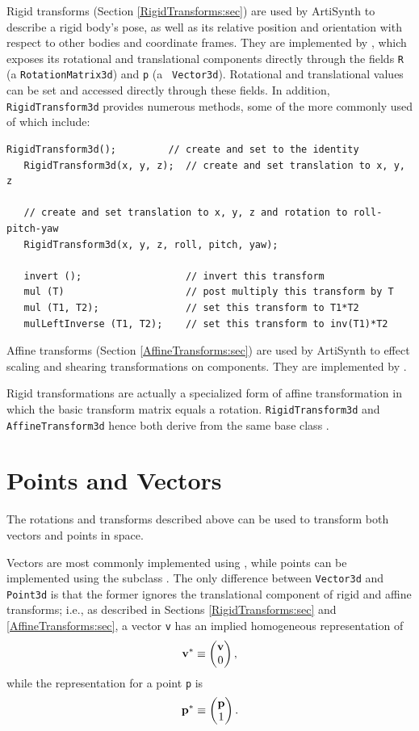 Rigid transforms (Section \ref{RigidTransforms:sec}) are used by
ArtiSynth to describe a rigid body's pose, as well as its relative
position and orientation with respect to other bodies and coordinate
frames.  They are implemented by
, which exposes its
rotational and translational components directly through the fields
{\tt R} (a {\tt RotationMatrix3d}) and {\tt p} (a {\tt
Vector3d}). Rotational and translational values can be set and
accessed directly through these fields.  In addition, {\tt
RigidTransform3d} provides numerous methods, some of the more commonly
used of which include:
%
\begin{lstlisting}[]
   RigidTransform3d();         // create and set to the identity
   RigidTransform3d(x, y, z);  // create and set translation to x, y, z

   // create and set translation to x, y, z and rotation to roll-pitch-yaw
   RigidTransform3d(x, y, z, roll, pitch, yaw);

   invert ();                  // invert this transform
   mul (T)                     // post multiply this transform by T
   mul (T1, T2);               // set this transform to T1*T2
   mulLeftInverse (T1, T2);    // set this transform to inv(T1)*T2
\end{lstlisting}
%

Affine transforms (Section \ref{AffineTransforms:sec}) are used by
ArtiSynth to effect scaling and shearing transformations on
components. They are implemented by
.

Rigid transformations are actually a specialized form of affine
transformation in which the basic transform matrix equals a rotation.
{\tt RigidTransform3d} and {\tt AffineTransform3d} hence both derive
from the same base class
.

\section{Points and Vectors}

The rotations and transforms described above can be used to transform
both vectors and points in space.

Vectors are most commonly implemented using
, while points can be implemented
using the subclass .  The only
difference between {\tt Vector3d} and {\tt Point3d} is that the former
ignores the translational component of rigid and affine transforms;
i.e., as described in Sections \ref{RigidTransforms:sec} and
\ref{AffineTransforms:sec}, a vector {\tt v} has
an implied homogeneous representation of
%
\begin{equation}
{\bf v}^* \equiv \left(\begin{matrix} {\bf v} \\ 0 \end{matrix}\right),
\end{equation}
%
while the representation for a point {\tt p} is
%
\begin{equation}
{\bf p}^* \equiv \left(\begin{matrix} {\bf p} \\ 1 \end{matrix}\right).
\end{equation}
%

